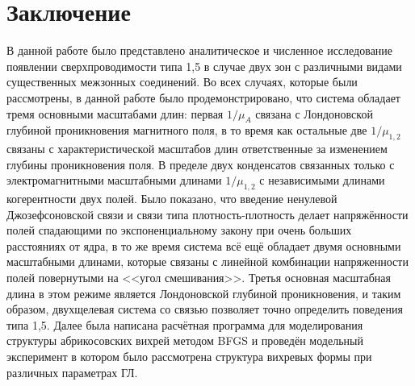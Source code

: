 \chapter*{Заключение}

В данной работе было представлено аналитическое и численное исследование 
появлении сверхпроводимости типа 1,5 в случае двух зон с различными видами 
существенных межзонных соединений. Во всех случаях, которые были рассмотрены, в 
данной работе было продемонстрировано, что система обладает тремя основными 
масштабами длин: первая \( 1/\mu_A \) связана с Лондоновской глубиной 
проникновения магнитного поля, в то время как остальные две \( 1/\mu_{1,2} \) 
связаны с характеристической масштабов длин ответственные за изменением 
глубины проникновения поля. В пределе двух конденсатов связанных только с 
электромагнитными масштабными длинами \( 1/\mu_{1,2} \) с независимыми  
длинами когерентности двух полей. Было показано, что введение ненулевой 
Джозефсоновской связи и связи типа плотность-плотность делает напряжённости 
полей спадающими по экспоненциальному закону при очень больших расстояниях от 
ядра, в то же время система всё ещё обладает двумя основными масштабными 
длинами, которые связаны с линейной комбинации напряженности полей повернутыми 
на <<угол смешивания>>. Третья основная масштабная длина в этом режиме является 
Лондоновской глубиной проникновения, и таким образом, двухщелевая система со 
связью позволяет точно определить поведения типа 1,5. Далее была написана 
расчётная программа для моделирования структуры абрикосовских вихрей методом 
BFGS и проведён модельный эксперимент в котором было рассмотрена структура 
вихревых формы при различных параметрах ГЛ.

\newpage